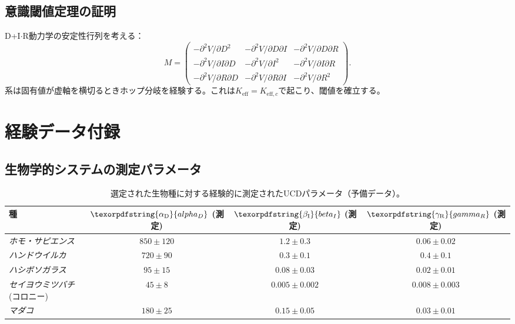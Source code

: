 \documentclass[11pt,a4paper]{article}
\DeclareRobustCommand{\alD}{\texorpdfstring{\ensuremath{\alpha_{\mathrm{D}}}}{alpha_D}}
\DeclareRobustCommand{\beI}{\texorpdfstring{\ensuremath{\beta_{\mathrm{I}}}}{beta_I}}
\DeclareRobustCommand{\gaR}{\texorpdfstring{\ensuremath{\gamma_{\mathrm{R}}}}{gamma_R}}
\newcommand{\eff}{\mathrm{eff}}
\newcommand{\Ke}{K_{\eff}}
\newcommand{\Kec}{K_{\eff,c}}
\begin{document}
	\subsection{意識閾値定理の証明}
	
	D+I\(\cdot\)R動力学の安定性行列を考える：
	\[
	M = \begin{pmatrix}
		-\partial^2 V/\partial D^2 & -\partial^2 V/\partial D\partial I & -\partial^2 V/\partial D\partial R \\
		-\partial^2 V/\partial I\partial D & -\partial^2 V/\partial I^2 & -\partial^2 V/\partial I\partial R \\
		-\partial^2 V/\partial R\partial D & -\partial^2 V/\partial R\partial I & -\partial^2 V/\partial R^2
	\end{pmatrix}.
	\]
	系は固有値が虚軸を横切るときホップ分岐を経験する。これは\(\Ke = \Kec\)で起こり、閾値を確立する。
	
	\section{経験データ付録}
	
	\subsection{生物学的システムの測定パラメータ}
	
	\begin{table}[ht]
		\centering
		\begin{tabular}{lccc}
			\toprule
			\textbf{種} & \(\alD\) (測定) & \(\beI\) (測定) & \(\gaR\) (測定) \\
			\midrule
			\textit{ホモ・サピエンス} & \(850 \pm 120\) & \(1.2 \pm 0.3\) & \(0.06 \pm 0.02\) \\
			\textit{ハンドウイルカ} & \(720 \pm 90\) & \(0.3 \pm 0.1\) & \(0.4 \pm 0.1\) \\
			\textit{ハシボソガラス} & \(95 \pm 15\) & \(0.08 \pm 0.03\) & \(0.02 \pm 0.01\) \\
			\textit{セイヨウミツバチ} (コロニー) & \(45 \pm 8\) & \(0.005 \pm 0.002\) & \(0.008 \pm 0.003\) \\
			\textit{マダコ} & \(180 \pm 25\) & \(0.15 \pm 0.05\) & \(0.03 \pm 0.01\) \\
			\bottomrule
		\end{tabular}
		\caption{選定された生物種に対する経験的に測定されたUCDパラメータ（予備データ）。}
		\label{tab:bio-measurements}
	\end{table}
	
\end{document}
